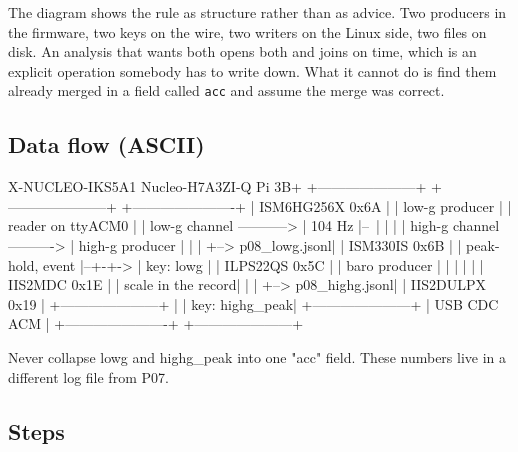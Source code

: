
The diagram shows the rule as structure rather than as advice. Two producers in the
firmware, two keys on the wire, two writers on the Linux side, two files on disk. An
analysis that wants both opens both and joins on time, which is an explicit operation
somebody has to write down. What it cannot do is find them already merged in a field
called \texttt{acc} and assume the merge was correct.

\subsection*{Data flow (ASCII)}

\begin{asciiart}
  X-NUCLEO-IKS5A1                 Nucleo-H7A3ZI-Q            Pi 3B+
  +---------------------+         +---------------------+    +----------------------+
  | ISM6HG256X   0x6A   |         | low-g producer      |    | reader on ttyACM0    |
  |   low-g channel ----------->  |   104 Hz            |--\ |   |                  |
  |   high-g channel ---------->  | high-g producer     |  | |   +--> p08_lowg.jsonl|
  | ISM330IS     0x6B   |         |   peak-hold, event  |--+-+->  |    key: lowg     |
  | ILPS22QS     0x5C   |         | baro producer       |  | |   |                  |
  | IIS2MDC      0x1E   |         |   scale in the record| | |   +--> p08_highg.jsonl|
  | IIS2DULPX    0x19   |         +---------------------+  | |        key: highg_peak|
  +---------------------+            |   USB CDC ACM       | +----------------------+
                                     +---------------------+

  Never collapse lowg and highg_peak into one "acc" field.
  These numbers live in a different log file from P07.
\end{asciiart}

\subsection*{Steps}

